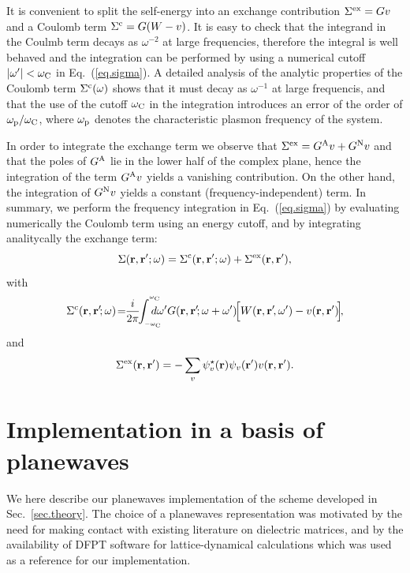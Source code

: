 \documentclass[twocolumn,prb,showpacs,superscriptaddress]{revtex4}
\def\w{\omega}
\def\wp{\omega^\prime}
\def\wc{{\omega_{\rm C}}}
\def\r{{\bf r}}
\def\rp{{\bf r^\prime}}
\begin{document}
It is convenient to split the self-energy into an exchange contribution 
$\Sigma^{\rm ex}=Gv$ and a Coulomb term $\Sigma^{\rm c}=G(W-v)$.\cite{blochl}
It is easy to check that the integrand in the Coulmb term decays as 
$\w^{-2}$ at large frequencies, therefore the integral is well behaved and the 
integration can be performed by using a numerical cutoff $|\wp|< \wc$ 
in Eq.\ (\ref{eq.sigma}).
A detailed analysis of the analytic properties of the Coulomb term
$\Sigma^{\rm c}(\w)$ shows that it must decay as $\w^{-1}$ 
at large frequencis, and that the use of the cutoff $\wc$ in the integration 
introduces an error of the order of $\w_{\rm p}/\wc$, where $\w_{\rm p}$ denotes
the characteristic plasmon frequency of the system.

In order to integrate the exchange term we observe that 
$\Sigma^{\rm ex}=G^{\rm A}v + G^{\rm N}v$
and that the poles of $G^{\rm A}$ lie in the lower half of the complex plane,
hence the integration of the term $G^{\rm A}v$ yields a vanishing contribution.
On the other hand, the integration of $G^{\rm N}v$ yields a constant (frequency-independent) term.\cite{note.integral}
In summary, we perform the frequency integration in Eq.\ (\ref{eq.sigma}) 
by evaluating numerically
the Coulomb term using an energy cutoff, and by integrating analitycally the exchange term:
  \begin{equation}
  \Sigma(\r,\rp;\w) = \Sigma^{\rm c}(\r,\rp;\w) + \Sigma^{\rm ex}(\r,\rp),
  \end{equation}
with
  \begin{equation}\label{eq.convolution}
 \Sigma^{\rm c}(\r,\rp\!;\w) \! = \!\! \frac{i}{2\pi} \!\!\int_{_{-\wc}}^{^\wc} \!\!\!\!\!\!\!d\wp 
 G(\r,\rp\!;\w+\wp) \!\Big[W(\r,\rp\!,\wp)-v(\r,\rp)\!\Big]\!,
  \end{equation}
and
  \begin{equation}
  \Sigma^{\rm ex}(\r,\rp) = - \sum_v \psi_v^\star(\r)\psi_v(\rp) v(\r,\rp).
  \end{equation}

\section{Implementation in a basis of planewaves}\label{sec.theory.g}

We here describe our planewaves implementation of the scheme 
developed in Sec.\ \ref{sec.theory}. The choice of a planewaves representation
was motivated by the need for making contact with existing literature on dielectric
matrices,\cite{cpm,hl86-prb,balde_tosa,baroni-resta} 
and by the availability of DFPT software for lattice-dynamical
calculations\cite{espresso} which was used as a reference for our implementation.
\end{document}

